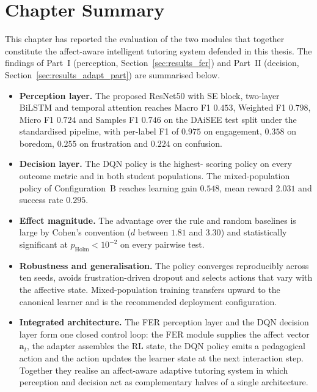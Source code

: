 \section{Chapter Summary}\label{sec:results_chapter_summary}

This chapter has reported the evaluation of the two modules
that together constitute the affect-aware intelligent tutoring
system defended in this thesis. The findings of Part~I
(perception, Section~\ref{sec:results_fer}) and Part~II
(decision, Section~\ref{sec:results_adapt_part}) are
summarised below.

\begin{itemize}
\item \textbf{Perception layer.} The proposed ResNet50 with \ac{SE}
block, two-layer \ac{BiLSTM} and temporal attention reaches Macro F1
$0.453$, Weighted F1 $0.798$, Micro F1 $0.724$ and Samples F1
$0.746$ on the \ac{DAiSEE} test split under the standardised
pipeline, with per-label F1 of $0.975$ on engagement, $0.358$
on boredom, $0.255$ on frustration and $0.224$ on confusion.
\item \textbf{Decision layer.} The \ac{DQN} policy is the highest-
scoring policy on every outcome metric and in both student
populations. The mixed-population policy of Configuration~B
reaches learning gain $0.548$, mean reward $2.031$ and success
rate $0.295$.
\item \textbf{Effect magnitude.} The advantage over the rule
and random baselines is large by Cohen's convention ($d$
between $1.81$ and $3.30$) and statistically significant at
$p_{\text{Holm}}<10^{-2}$ on every pairwise test.
\item \textbf{Robustness and generalisation.} The policy
converges reproducibly across ten seeds, avoids
frustration-driven dropout and selects actions that vary with
the affective state. Mixed-population training transfers upward
to the canonical learner and is the recommended deployment
configuration.
\item \textbf{Integrated architecture.} The \ac{FER} perception
layer and the \ac{DQN} decision layer form one closed control loop:
the \ac{FER} module supplies the affect vector $\mathbf{a}_t$, the
adapter assembles the \ac{RL} state, the \ac{DQN} policy emits a
pedagogical action and the action updates the learner state at
the next interaction step. Together they realise an
affect-aware adaptive tutoring system in which perception and
decision act as complementary halves of a single architecture.
\end{itemize}
